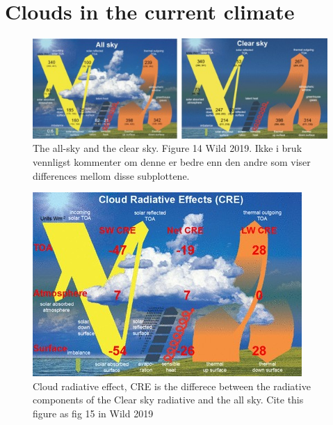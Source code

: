 \\ \\ 
\section{Clouds in the current climate}
\begin{figure}
    \centering
    \includegraphics[scale = 7]{Chapter1_Intro/both_wild2019.jpg}
    \caption{The all-sky and the clear sky. Figure 14 Wild 2019. Ikke i bruk vennligst kommenter om denne er bedre enn den andre som viser differences mellom disse subplottene.}
    \label{fig:both_wild}
\end{figure}

\begin{figure}
    \centering
    \includegraphics[scale = 7]{Chapter1_Intro/CRE_wild2019.jpg}
    \caption{Cloud radiative effect, CRE is the differece between the radiative components of the Clear sky radiative and the all sky. Cite this figure as fig 15 in Wild 2019}
    \label{fig:cre}
\end{figure}

